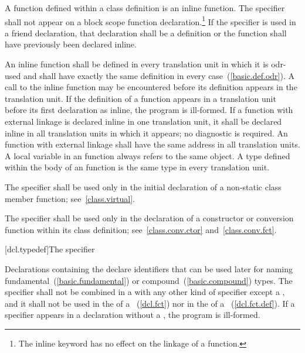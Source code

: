 \pnum
A function defined within a class definition is an inline function. The
 specifier shall not appear on a block scope function
declaration.\footnote{The inline keyword has no effect on the linkage of a function.}
If the  specifier is used in a friend declaration, that
declaration shall be a definition or the function shall have previously
been declared inline.

\pnum
An inline function shall be defined in every translation unit in which
it is odr-used and shall have exactly the same definition in every
case~(\ref{basic.def.odr}).
\enternote
A call to the inline function may be encountered before its definition
appears in the translation unit.
\exitnote
If the definition of a function appears in a translation unit before its
first declaration as inline, the program is ill-formed. If a function
with external linkage is declared inline in one translation unit, it
shall be declared inline in all translation units in which it appears;
no diagnostic is required. An  function with external
linkage shall have the same address in all translation units. A
 local variable in an  
function always refers to the same object. 
A type defined within the body of an  function is the
same type in every translation unit.

\pnum
{}%
The  specifier shall be used only in the initial
declaration of a non-static class member function;
see~\ref{class.virtual}.

\pnum
{}%
The  specifier shall be used only in the declaration of
a constructor or conversion function within its class definition;
see~\ref{class.conv.ctor} and~\ref{class.conv.fct}.

[dcl.typedef]{The  specifier}%

\pnum
Declarations containing the  
declare identifiers that can be used later for naming
fundamental~(\ref{basic.fundamental}) or compound~(\ref{basic.compound})
types. The  specifier shall not be
combined in a  with any other kind of
specifier except a , and it shall not be used in the
 of a
~(\ref{dcl.fct}) nor in the
 of a
~(\ref{dcl.fct.def}).
If a  specifier appears in a declaration without a ,
the program is ill-formed.

